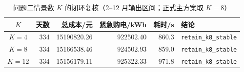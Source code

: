 \begin{table}[htbp]
\centering
\caption{问题二情景数 $K$ 的闭环复核（2--12 月输出区间；正式主方案取 $K=8$）}\label{tab:q2-parameter}
\normalsize\setlength{\tabcolsep}{5pt}
\begin{tabular}{@{}crrrrl@{}}
\toprule
$K$ & 天数 & 总成本/元 & 紧急购电/kWh & 耗时/s & 结论 \\
\midrule
$K=4$ & 334 & 15190820.26 & 922502.40 & 860.3 & \texttt{retain\_k8\_stable} \\
$K=8$ & 334 & 15166538.46 & 924502.93 & 859.0 & \texttt{retain\_k8\_stable} \\
$K=12$ & 334 & 15156179.11 & 925322.33 & 971.8 & \texttt{retain\_k8\_stable} \\\bottomrule
\end{tabular}
\end{table}

